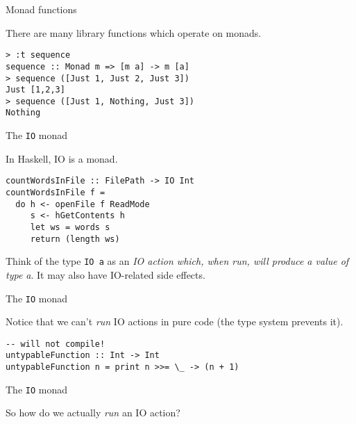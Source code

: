 %
\begin{frame}[fragile]{Monad functions}

There are many library functions which operate on monads.

\begin{block}{}
\begin{verbatim}
> :t sequence
sequence :: Monad m => [m a] -> m [a]
> sequence ([Just 1, Just 2, Just 3])
Just [1,2,3]
> sequence ([Just 1, Nothing, Just 3])
Nothing
\end{verbatim}
\end{block}

\end{frame}

%
\begin{frame}[fragile]{The \texttt{IO} monad}

In Haskell, IO is a monad.

\begin{block}{}
\begin{verbatim}
countWordsInFile :: FilePath -> IO Int
countWordsInFile f = 
  do h <- openFile f ReadMode
     s <- hGetContents h
     let ws = words s
     return (length ws)
\end{verbatim}
\end{block}

Think of the type \texttt{IO a} as an \emph{IO action which, when run, will
produce a value of type a}. It may also have IO-related side effects.

\end{frame}

%
\begin{frame}[fragile]{The \texttt{IO} monad}

Notice that we can't \emph{run} IO actions in pure code (the type system
prevents it).

\begin{block}{}
\begin{verbatim}
-- will not compile!
untypableFunction :: Int -> Int
untypableFunction n = print n >>= \_ -> (n + 1)
\end{verbatim}
\end{block}

\end{frame}

%
\begin{frame}[fragile]{The \texttt{IO} monad}

So how do we actually \emph{run} an IO action?

\end{frame}

